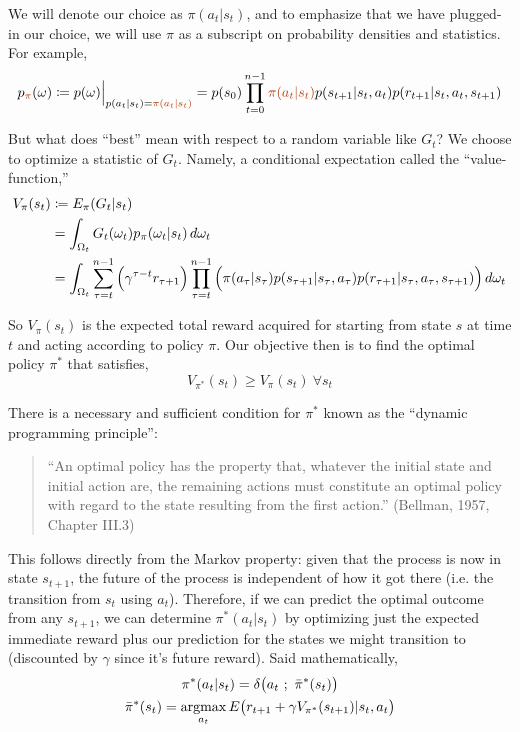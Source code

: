 We will denote our choice as $\pi(a_t|s_t)$, and to emphasize that we have plugged-in our choice, we will use $\pi$ as a subscript on probability densities and statistics. For example,
\begin{equation*}
p_{\orange{\pi}}(\omega) \coloneqq p(\omega)\Big{|}_{p(a_t|s_t) = \orange{\pi(a_t|s_t)}} = p(s_0) \prod_{t=0}^{n-1} \orange{\pi(a_t|s_t)}p(s_{t+1}|s_t,a_t)p(r_{t+1}|s_t,a_t,s_{t+1})
\end{equation*}

But what does ``best'' mean with respect to a random variable like $G_t$? We choose to optimize a statistic of $G_t$. Namely, a conditional expectation called the ``value-function,''
\begin{align*}
V_\pi(s_t) &\coloneqq E_\pi(G_t | s_t)\\
&= \int_{\Omega_t} G_t(\omega_t) p_\pi(\omega_t|s_t)\,d\omega_t\\
&= \int_{\Omega_t} \sum_{\tau=t}^{n-1} \Big{(}\gamma^{\tau-t} r_{\tau+1}\Big{)} \prod_{\tau=t}^{n-1} \Big{(}\pi(a_\tau|s_\tau)p(s_{\tau+1}|s_\tau,a_\tau)p(r_{\tau+1}|s_\tau,a_\tau,s_{\tau+1})\Big{)} \,d\omega_t
\end{align*}

So $V_\pi(s_t)$ is the expected total reward acquired for starting from state $s$ at time $t$ and acting according to policy $\pi$. Our objective then is to find the optimal policy $\pi^*$ that satisfies,
\begin{equation*}
V_{\pi^*}(s_t) \geq V_{\pi}(s_t)\ \forall s_t
\end{equation*}

There is a necessary and sufficient condition for $\pi^*$ known as the ``dynamic programming principle'':
\begin{quote}
``An optimal policy has the property that, whatever the initial state and initial action are, the remaining actions must constitute an optimal policy with regard to the state resulting from the first action.'' (Bellman, 1957, Chapter III.3)
\end{quote}

This follows directly from the Markov property: given that the process is now in state $s_{t+1}$, the future of the process is independent of how it got there (i.e. the transition from $s_t$ using $a_t$). Therefore, if we can predict the optimal outcome from any $s_{t+1}$, we can determine $\pi^*(a_t|s_t)$ by optimizing just the expected immediate reward plus our prediction for the states we might transition to (discounted by $\gamma$ since it's future reward). Said mathematically,
\begin{gather*}
\pi^*(a_t|s_t) = \delta\big{(}a_t\ ;\ \bar{\pi}^*(s_t)\big{)}\\
\bar{\pi}^*(s_t) = \operatorname*{argmax}_{a_t} E\big{(}r_{t+1} + \gamma V_{\pi^*}(s_{t+1}) | s_t, a_t\big{)}
\end{gather*}

